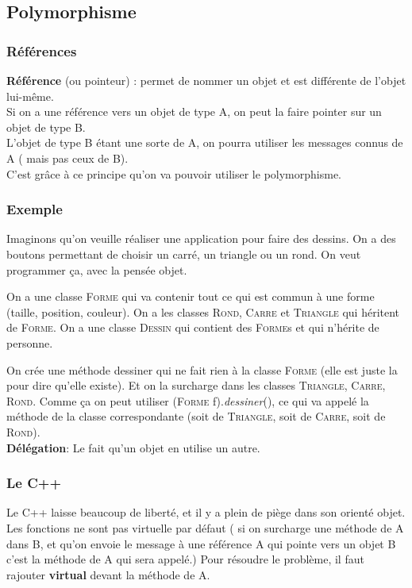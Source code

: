 \subsection{Polymorphisme}



\subsubsection{Références}
\textbf{Référence} (ou pointeur) : permet de nommer un objet et est différente de l’objet lui-même.
\\Si on a une référence vers un objet de type A, on peut la faire pointer sur un objet de type B.
\\L’objet de type B étant une sorte de A, on pourra utiliser les messages connus de A ( mais pas ceux de B).
\\C’est grâce à ce principe qu’on va pouvoir utiliser le polymorphisme.



\subsubsection{Exemple}
Imaginons qu'on veuille réaliser une application pour faire des dessins. On a des boutons permettant de choisir un carré, un triangle ou un rond. On veut programmer ça, avec la pensée objet.

On a une classe \textsc{Forme} qui va contenir tout ce qui est commun à une forme (taille, position, couleur). On a les classes \textsc{Rond}, \textsc{Carre} et \textsc{Triangle} qui héritent de \textsc{Forme}. On a une classe \textsc{Dessin} qui contient des \textsc{Forme}s et qui n’hérite de personne.

On crée une méthode dessiner qui ne fait rien à la classe \textsc{Forme} (elle est juste la pour dire qu’elle existe). Et on la surcharge dans les classes \textsc{Triangle}, \textsc{Carre}, \textsc{Rond}. Comme ça on peut utiliser (\textsc{Forme} f).\textit{dessiner}(), ce qui va appelé la méthode de la classe correspondante (soit de \textsc{Triangle}, soit de \textsc{Carre}, soit de \textsc{Rond}).
\\\textbf{Délégation}: Le fait qu’un objet en utilise un autre.



\subsubsection{Le C++}
Le C++ laisse beaucoup de liberté, et il y a plein de piège dans son orienté objet.
Les fonctions ne sont pas virtuelle par défaut ( si on surcharge une méthode de A dans B, et qu’on envoie le message à une référence A qui pointe vers un objet B c’est la méthode de A qui sera appelé.) Pour résoudre le problème, il faut rajouter \textbf{virtual} devant la méthode de A.

